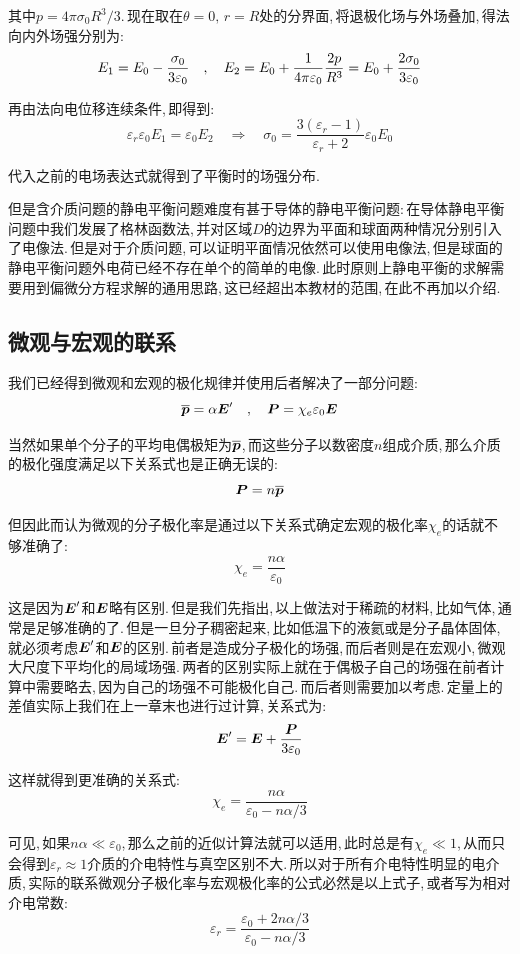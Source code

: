 其中$p=4\pi\sigma_0 R^3/3$.\,现在取在$\theta=0,\,r=R$处的分界面,\,将退极化场与外场叠加,\,得法向内外场强分别为:
\[E_1=E_0-\frac{\sigma_0	}{3\varepsilon_0}\quad ,\quad E_2 =E_0+\frac{1}{4\pi\varepsilon_0} \frac{2p}{R^3}=E_0+\frac{2\sigma_0	}{3\varepsilon_0}\]

再由法向电位移连续条件,\,即得到:
\[\varepsilon_r \varepsilon_0 E_1=\varepsilon_0 E_2\quad \Rightarrow \quad \sigma_0=\frac{3(\varepsilon_r-1)}{\varepsilon_r+2}\varepsilon_0 E_0\]

代入之前的电场表达式就得到了平衡时的场强分布.

\vspace{1cm}

但是含介质问题的静电平衡问题难度有甚于导体的静电平衡问题:\,在导体静电平衡问题中我们发展了格林函数法,\,并对区域$D$的边界为平面和球面两种情况分别引入了电像法.\,但是对于介质问题,\,可以证明平面情况依然可以使用电像法,\,但是球面的静电平衡问题外电荷已经不存在单个的简单的电像.\,此时原则上静电平衡的求解需要用到偏微分方程求解的通用思路,\,这已经超出本教材的范围,\,在此不再加以介绍.


\subsection{微观与宏观的联系}

我们已经得到微观和宏观的极化规律并使用后者解决了一部分问题:
\[\overline{\boldsymbol{p}}=\alpha \boldsymbol{E}'\quad ,\quad \boldsymbol{P}=\chi_e \varepsilon_0\boldsymbol{E}\]

当然如果单个分子的平均电偶极矩为$\overline{\boldsymbol{p}}$,\,而这些分子以数密度$n$组成介质,\,那么介质的极化强度满足以下关系式也是正确无误的:
\[\boldsymbol{P}=n\overline{\boldsymbol{p}}\]

但因此而认为微观的分子极化率是通过以下关系式确定宏观的极化率$\chi_e$的话就不够准确了:
\[\chi_e=\frac{n\alpha }{\varepsilon_0}\]

这是因为$\boldsymbol{E}'$和$\boldsymbol{E}$略有区别.\,但是我们先指出,\,以上做法对于稀疏的材料,\,比如气体,\,通常是足够准确的了.\,但是一旦分子稠密起来,\,比如低温下的液氦或是分子晶体固体,\,就必须考虑$\boldsymbol{E}'$和$\boldsymbol{E}$的区别.\,前者是造成分子极化的场强,\,而后者则是在宏观小,\,微观大尺度下平均化的局域场强.\,两者的区别实际上就在于偶极子自己的场强在前者计算中需要略去,\,因为自己的场强不可能极化自己.\,而后者则需要加以考虑.\,定量上的差值实际上我们在上一章末也进行过计算,\,关系式为:
\[\boldsymbol{E}'=\boldsymbol{E}+\frac{\boldsymbol{P}}{3\varepsilon_0}\]

这样就得到更准确的关系式:
\[\chi_e=\frac{n\alpha}{\varepsilon_0-n\alpha/3}\]

可见,\,如果$n\alpha\ll \varepsilon_0$,\,那么之前的近似计算法就可以适用,\,此时总是有$\chi_e\ll 1$,\,从而只会得到$\varepsilon_r\approx 1$介质的介电特性与真空区别不大.\,所以对于所有介电特性明显的电介质,\,实际的联系微观分子极化率与宏观极化率的公式必然是以上式子,\,或者写为相对介电常数:
\[\varepsilon_r=\frac{\varepsilon_0+2n\alpha/3}{\varepsilon_0-n\alpha/3}\]

